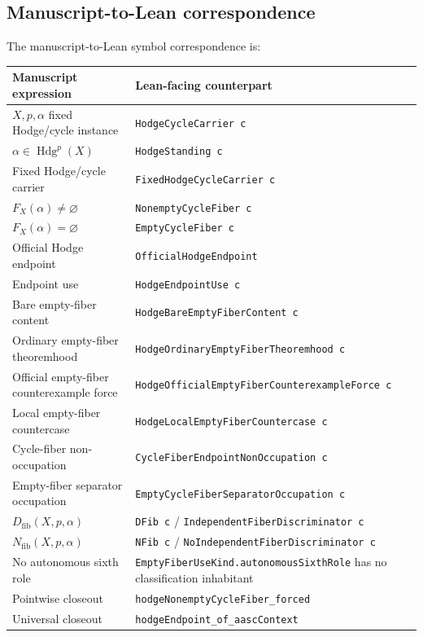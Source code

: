 \documentclass[11pt]{article}
\newcommand{\Hdg}{\operatorname{Hdg}}
\begin{document}
\subsection{Manuscript-to-Lean correspondence}

The manuscript-to-Lean symbol correspondence is:
{\scriptsize
\begin{longtable}{p{}p{}}
\toprule Manuscript expression & Lean-facing counterpart\\ \midrule\endhead
$X,p,\alpha$ fixed Hodge/cycle instance & \texttt{HodgeCycleCarrier c}\\
$\alpha\in\Hdg^p(X)$ & \texttt{HodgeStanding c}\\
Fixed Hodge/cycle carrier & \texttt{FixedHodgeCycleCarrier c}\\
$F_X(\alpha)\neq\varnothing$ & \texttt{NonemptyCycleFiber c}\\
$F_X(\alpha)=\varnothing$ & \texttt{EmptyCycleFiber c}\\
Official Hodge endpoint & \texttt{OfficialHodgeEndpoint}\\
Endpoint use & \texttt{HodgeEndpointUse c}\\
Bare empty-fiber content & \texttt{HodgeBareEmptyFiberContent c}\\
Ordinary empty-fiber theoremhood & \texttt{HodgeOrdinaryEmptyFiberTheoremhood c}\\
Official empty-fiber counterexample force & \texttt{HodgeOfficialEmptyFiberCounterexampleForce c}\\
Local empty-fiber countercase & \texttt{HodgeLocalEmptyFiberCountercase c}\\
Cycle-fiber non-occupation & \texttt{CycleFiberEndpointNonOccupation c}\\
Empty-fiber separator occupation & \texttt{EmptyCycleFiberSeparatorOccupation c}\\
$D_{\mathrm{fib}}(X,p,\alpha)$ & \texttt{DFib c} / \texttt{IndependentFiberDiscriminator c}\\
$N_{\mathrm{fib}}(X,p,\alpha)$ & \texttt{NFib c} / \texttt{NoIndependentFiberDiscriminator c}\\
No autonomous sixth role & \texttt{EmptyFiberUseKind.autonomousSixthRole} has no classification inhabitant\\
Pointwise closeout & \texttt{hodgeNonemptyCycleFiber\_forced}\\
Universal closeout & \texttt{hodgeEndpoint\_of\_aascContext}\\
\bottomrule
\end{longtable}
}
\end{document}
